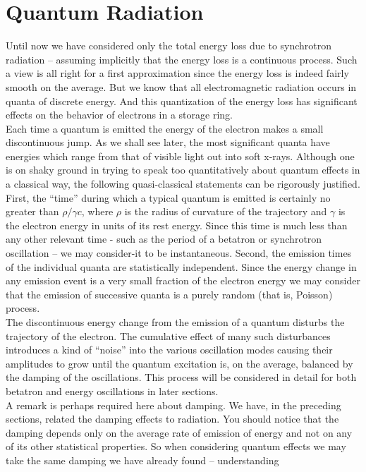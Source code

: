 \documentclass[../sands-adaptation.tex]{subfiles}
\begin{document}
\section{Quantum Radiation} \label{sec:5.1}

Until now we have considered only the total energy loss due to synchrotron radiation -- assuming implicitly that the energy loss is a continuous process. Such a view is all right for a first
 approximation since the energy loss is indeed fairly smooth on the average. But we know that all electromagnetic radiation occurs in quanta of discrete energy. And this quantization of the energy loss has significant effects on the behavior of electrons in a storage ring.\\
Each time a quantum is emitted the energy of the electron makes a small discontinuous jump. As we shall see later, the most significant quanta have energies which range from that of visible light out into soft x-rays. Although one is on shaky ground in trying to speak too quantitatively about quantum effects in a classical way, the following quasi-classical statements can be rigorously
 justified. First, the ``time'' during which a typical quantum is emitted is certainly no greater
than $\rho/\gamma c$, where $\rho$ is the radius of curvature of the trajectory and $\gamma$ is the electron energy in units of its rest energy. Since this time is much less than any other
relevant time - such as the period of a betatron or synchrotron oscillation -- we may consider-it
 to be instantaneous. Second, the emission times of the individual quanta are statistically
 independent. Since the energy change in any emission event is a very small fraction of the electron energy we may consider that the emission of successive quanta is a purely random (that is, Poisson) process.\\
The discontinuous energy change from the emission of a quantum disturbs the trajectory of the electron. The cumulative effect of many such disturbances introduces a kind of ``noise'' into the various oscillation modes causing their amplitudes to grow until the quantum excitation is, on the average, balanced by the damping of the oscillations. This process will be considered in detail for both betatron and energy oscillations in later sections.\\
A remark is perhaps required here about damping. We have, in the preceding sections, related the damping effects to radiation. You should notice that the damping depends only on the average rate of emission of energy and not on any of its other statistical properties. So when considering quantum effects we may take the same damping we have already found -- understanding
\end{document}
